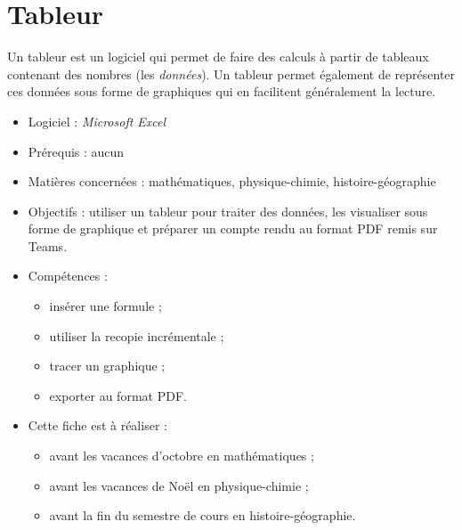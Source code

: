 \chapter{Tableur}\label{ficheTableur1}  

Un tableur est un logiciel qui permet de faire des calculs à partir de tableaux contenant des nombres (les \emph{données}). Un tableur permet également de représenter ces données sous forme de graphiques qui en facilitent généralement la lecture.\\


{\footnotesize
\begin{itemize}
\item Logiciel : \emph{Microsoft Excel}
\item Prérequis : aucun
\item Matières concernées : mathématiques, physique-chimie, histoire-géographie
\item Objectifs : utiliser un tableur pour traiter des données, les visualiser sous forme de graphique et préparer un compte rendu au format PDF remis sur Teams.
\item Compétences : 
        \begin{itemize}
        \item insérer une formule ;
        \item utiliser la recopie incrémentale ;
        \item tracer un graphique ;
        \item exporter au format PDF.
        \end{itemize}
\item Cette fiche est à réaliser :
        \begin{itemize}
        \item avant les vacances d'octobre en mathématiques ;
        \item avant les vacances de Noël en physique-chimie ;
        \item avant la fin du semestre de cours en histoire-géographie. 
        \end{itemize}
\end{itemize}
}


